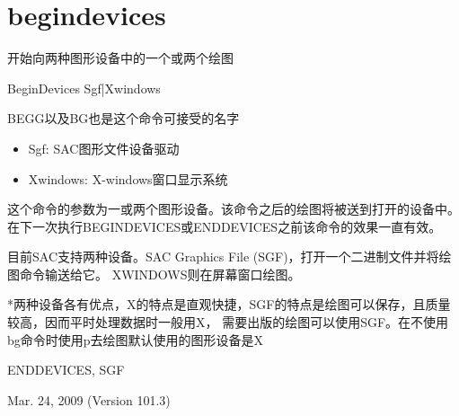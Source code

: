 \section{begindevices}
\label{cmd:begindevices}

开始向两种图形设备中的一个或两个绘图

BeginDevices Sgf|Xwindows

BEGG以及BG也是这个命令可接受的名字

\begin{itemize}
\item Sgf: SAC图形文件设备驱动
\item Xwindows: X-windows窗口显示系统
\end{itemize}

这个命令的参数为一或两个图形设备。该命令之后的绘图将被送到打开的设备中。在下一次执行BEGINDEVICES或ENDDEVICES之前该命令的效果一直有效。

目前SAC支持两种设备。SAC Graphics File (SGF)，打开一个二进制文件并将绘图命令输送给它。
XWINDOWS则在屏幕窗口绘图。

*两种设备各有优点，X的特点是直观快捷，SGF的特点是绘图可以保存，且质量较高，因而平时处理数据时一般用X，
需要出版的绘图可以使用SGF。在不使用bg命令时使用p去绘图默认使用的图形设备是X

ENDDEVICES, SGF

Mar. 24, 2009 (Version 101.3)
